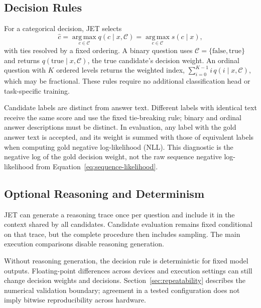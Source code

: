 \subsection{Decision Rules}
For a categorical decision, JET selects
\begin{equation}
  \hat c=\operatorname*{arg\,max}_{c\in\mathcal{C}}q(c\mid x,\mathcal{C})
  =\operatorname*{arg\,max}_{c\in\mathcal{C}}s(c\mid x),
  \label{eq:decision}
\end{equation}
with ties resolved by a fixed ordering. A binary question uses
$\mathcal{C}=\{\mathrm{false},\mathrm{true}\}$ and returns
$q(\mathrm{true}\mid x,\mathcal{C})$, the true candidate's decision weight.
An ordinal question with $K$ ordered levels returns the weighted index,
$\sum_{i=0}^{K-1} i\,q(i\mid x,\mathcal{C})$, which may be fractional.
These rules require no additional classification head or task-specific training.

Candidate labels are distinct from answer text. Different labels with identical
text receive the same score and use the fixed tie-breaking rule; binary
and ordinal answer descriptions must be distinct. In evaluation, any label with
the gold answer text is accepted, and its weight is summed with those of
equivalent labels when computing gold negative log-likelihood (NLL). This
diagnostic is the negative log of the gold decision weight, not the raw
sequence negative log-likelihood from Equation~\ref{eq:sequence-likelihood}.

\subsection{Optional Reasoning and Determinism}
JET can generate a reasoning trace once per question and include it in the
context shared by all candidates. Candidate evaluation remains fixed conditional
on that trace, but the complete procedure then includes sampling. The main
execution comparisons disable reasoning generation.

Without reasoning generation, the decision rule is deterministic for fixed
model outputs. Floating-point differences across devices and execution settings
can still change decision weights and decisions. Section~\ref{sec:repeatability}
describes the numerical validation boundary; agreement in a tested configuration
does not imply bitwise reproducibility across hardware.
